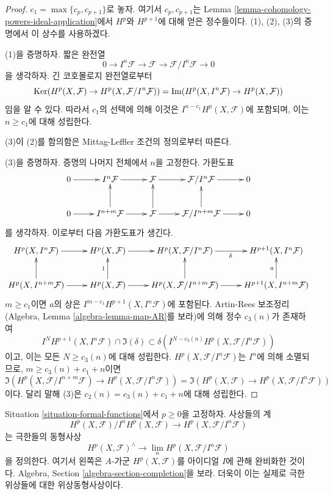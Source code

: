 \begin{proof}
$c_1 = \max\{c_p, c_{p + 1}\}$로 놓자. 여기서 $c_p, c_{p +1}$는
Lemma \ref{lemma-cohomology-powers-ideal-application}에서 $H^p$와
$H^{p + 1}$에 대해 얻은 정수들이다. (1), (2), (3)의 증명에서 이
상수를 사용하겠다.

\medskip\noindent
(1)을 증명하자. 짧은 완전열
$$
0 \to I^n\mathcal{F} \to \mathcal{F} \to \mathcal{F}/I^n\mathcal{F} \to 0
$$
을 생각하자. 긴 코호몰로지 완전열로부터
$$
\mathop{\mathrm{Ker}}(
H^p(X, \mathcal{F}) \to H^p(X, \mathcal{F}/I^n\mathcal{F})
)
=
\mathop{\mathrm{Im}}(
H^p(X, I^n\mathcal{F}) \to H^p(X, \mathcal{F})
)
$$
임을 알 수 있다. 따라서 $c_1$의 선택에 의해 이것은
$I^{n - c_1}H^p(X, \mathcal{F})$에 포함되며, 이는
$n \geq c_1$에 대해 성립한다.

\medskip\noindent
(3)이 (2)를 함의함은 Mittag-Leffler 조건의 정의로부터 따른다.

\medskip\noindent
(3)을 증명하자. 증명의 나머지 전체에서 $n$을 고정한다. 가환도표
$$
\xymatrix{
0 \ar[r] &
I^n\mathcal{F} \ar[r] &
\mathcal{F} \ar[r] &
\mathcal{F}/I^n\mathcal{F} \ar[r] &
0 \\
0 \ar[r] &
I^{n + m}\mathcal{F} \ar[r] \ar[u] &
\mathcal{F} \ar[r] \ar[u] &
\mathcal{F}/I^{n + m}\mathcal{F} \ar[r] \ar[u] &
0
}
$$
를 생각하자. 이로부터 다음 가환도표가 생긴다.
$$
\xymatrix{
H^p(X, I^n\mathcal{F}) \ar[r] &
H^p(X, \mathcal{F}) \ar[r] &
H^p(X, \mathcal{F}/I^n\mathcal{F}) \ar[r]_\delta &
H^{p + 1}(X, I^n\mathcal{F}) \\
H^p(X, I^{n + m}\mathcal{F}) \ar[r] \ar[u] &
H^p(X, \mathcal{F}) \ar[r] \ar[u]^1 &
H^p(X, \mathcal{F}/I^{n + m}\mathcal{F}) \ar[r] \ar[u] &
H^{p + 1}(X, I^{n + m}\mathcal{F}) \ar[u]^a
}
$$
$m \geq c_1$이면 $a$의 상은
$I^{m - c_1} H^{p + 1}(X, I^n\mathcal{F})$에 포함된다. Artin-Rees
보조정리(Algebra, Lemma \ref{algebra-lemma-map-AR}를 보라)에 의해
정수 $c_3(n)$가 존재하여
$$
I^N H^{p + 1}(X, I^n\mathcal{F}) \cap \Im(\delta)
\subset
\delta\left(I^{N - c_3(n)}H^p(X, \mathcal{F}/I^n\mathcal{F})\right)
$$
이고, 이는 모든 $N \geq c_3(n)$에 대해 성립한다.
$H^p(X, \mathcal{F}/I^n\mathcal{F})$는 $I^n$에 의해 소멸되므로,
$m \geq c_3(n) + c_1 + n$이면
$$
\Im(H^p(X, \mathcal{F}/I^{n + m}\mathcal{F})
\to H^p(X, \mathcal{F}/I^n\mathcal{F}))
=
\Im(H^p(X, \mathcal{F})
\to H^p(X, \mathcal{F}/I^n\mathcal{F}))
$$
이다. 달리 말해 (3)은 $c_2(n) = c_3(n) + c_1 + n$에 대해 성립한다.
\end{proof}

\begin{theorem}[형식적 함수 정리]
\label{theorem-formal-functions}
Situation \ref{situation-formal-functions}에서 $p \geq 0$을 고정하자.
사상들의 계
$$
H^p(X, \mathcal{F})/I^nH^p(X, \mathcal{F})
\longrightarrow
H^p(X, \mathcal{F}/I^n\mathcal{F})
$$
는 극한들의 동형사상
$$
H^p(X, \mathcal{F})^\wedge
\longrightarrow
\lim_n H^p(X, \mathcal{F}/I^n\mathcal{F})
$$
을 정의한다. 여기서 왼쪽은 $A$-가군 $H^p(X, \mathcal{F})$를
아이디얼 $I$에 관해 완비화한 것이다. Algebra, Section
\ref{algebra-section-completion}을 보라. 더욱이 이는 실제로 극한
위상들에 대한 위상동형사상이다.
\end{theorem}

